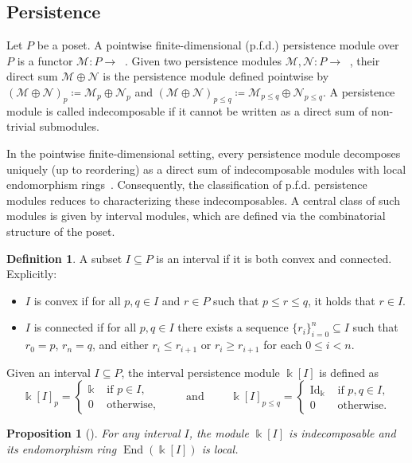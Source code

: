 \documentclass[reqno,12pt]{amsart}
\newcommand{\cM}{\mathcal{M}}
\newcommand{\cN}{\mathcal{N}}
\DeclareMathOperator{\vect}{\mathbf{vect}_\Bbbk}
\DeclareMathOperator{\End}{End}
\newcommand{\0}{\mathbf 0}
\newtheorem{proposition}[theorem]{Proposition}
\theoremstyle{definition}
\newtheorem{definition}[theorem]{Definition}
\begin{document}
\subsection{Persistence}
Let $P$ be a poset. A pointwise finite-dimensional (p.f.d.) persistence module over $P$ is a functor $\cM\colon P\to \vect$. Given two persistence modules $\cM, \cN\colon P\to \vect$, their direct sum $\cM\oplus\cN$ is the persistence module defined pointwise by $(\cM\oplus\cN)_p\coloneqq \cM_p\oplus\cN_p$ and $(\cM\oplus\cN)_{p\leq q}\coloneqq \cM_{p\leq q}\oplus\cN_{p\leq q}$. A persistence module is called indecomposable if it cannot be written as a direct sum of non-trivial submodules. 

In the pointwise finite-dimensional setting, every persistence module decomposes uniquely (up to reordering) as a direct sum of indecomposable modules with local endomorphism rings~\cite{Bakke_Crawley20}. Consequently, the classification of p.f.d. persistence modules reduces to characterizing these indecomposables. A central class of such modules is given by interval modules, which are defined via the combinatorial structure of the poset.

\begin{definition}
A subset $I \subseteq P$ is an interval if it is both convex and connected. Explicitly:
\begin{itemize}
    \item $I$ is convex if for all $p,q \in I$ and $r \in P$ such that $p \leq r \leq q$, it holds that $r \in I$.
    \item $I$ is connected if for all $p,q \in I$ there exists a sequence $\{r_i\}_{i=0}^n \subseteq I$ such that $r_0=p$, $r_n=q$, and either $r_i \leq r_{i+1}$ or $r_i \geq r_{i+1}$ for each $0\leq i < n$.
\end{itemize}
\end{definition}

Given an interval $I \subseteq P$, the interval persistence module $\Bbbk[I]$ is defined as
\begin{equation*}
\Bbbk[I]_p=\begin{cases}\Bbbk & \text{ if } p\in I ,\\
0 & \text{ otherwise,}
\end{cases}
\qquad \text{ and } \qquad
\Bbbk[I]_{p\leq q}=\begin{cases}
\mathrm{Id}_\Bbbk & \text{ if } p,q\in I, \\
0 & \text{ otherwise.}
\end{cases}
\end{equation*}
\begin{proposition}[{\!\cite[Proposition 2.2]{Botnan_Lesnick18}}]
    For any interval $I$, the module $\Bbbk[I]$ is indecomposable and its endomorphism ring $\End(\Bbbk[I])$ is local.
\end{proposition}
\end{document}

